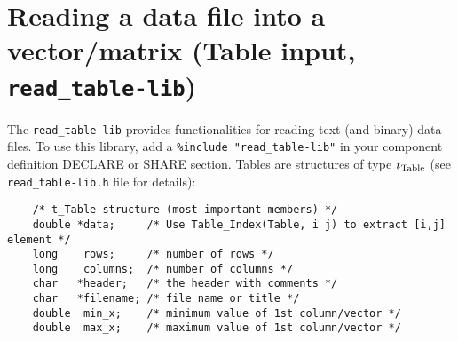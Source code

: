 \section{Reading a data file into a vector/matrix (Table input, \texttt{read\_table-lib})}
\label{s:read-table}
  The \verb+read_table-lib+ provides functionalities for reading text
  (and binary) data files. To use this library,
  add a \verb+%include "read_table-lib"+ in your component definition
  DECLARE or SHARE section. Tables are structures of type $t_{\rm Table}$
  (see \verb+read_table-lib.h+ file for details):
\begin{verbatim}
    /* t_Table structure (most important members) */
    double *data;     /* Use Table_Index(Table, i j) to extract [i,j] element */
    long    rows;     /* number of rows */
    long    columns;  /* number of columns */
    char   *header;   /* the header with comments */
    char   *filename; /* file name or title */
    double  min_x;    /* minimum value of 1st column/vector */
    double  max_x;    /* maximum value of 1st column/vector */
\end{verbatim}

